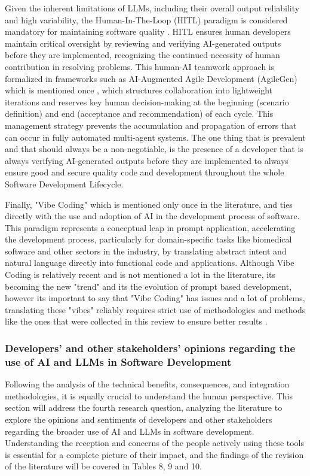 Given the inherent limitations of LLMs, including their overall output reliability and high variability, the Human-In-The-Loop (HITL) paradigm is considered mandatory for maintaining software quality \cite{Kim:2025ao}. HITL ensures human developers maintain critical oversight by reviewing and verifying AI-generated outputs before they are implemented, recognizing the continued necessity of human contribution in resolving problems. This human-AI teamwork approach is formalized in frameworks such as AI-Augmented Agile Development (AgileGen) which is mentioned once \cite{Zhang:2025ea}, which structures collaboration into lightweight iterations and reserves key human decision-making at the beginning (scenario definition) and end (acceptance and recommendation) of each cycle. This management strategy prevents the accumulation and propagation of errors that can occur in fully automated multi-agent systems. The one thing that is prevalent and that should always be a non-negotiable, is the presence of a developer that is always verifying AI-generated outputs before they are implemented to always ensure good and secure quality code and development throughout the whole Software Development Lifecycle.

Finally, "Vibe Coding" which is mentioned only once in the literature, and ties directly with the use and adoption of AI in the development process of software. This paradigm represents a conceptual leap in prompt application, accelerating the development process, particularly for domain-specific tasks like biomedical software and other sectors in the industry, by translating abstract intent and natural language directly into functional code and applications. Although Vibe Coding is relatively recent and is not mentioned a lot in the literature, its becoming the new "trend" and its the evolution of prompt based development, however its important to say that "Vibe Coding" has issues and a lot of problems, translating these "vibes" reliably requires strict use of methodologies and methods like the ones that were collected in this review to ensure better results \cite{Moore:2025vc}. 


\subsubsection{Developers’ and other stakeholders’ opinions regarding the use of AI and LLMs in Software Development}

Following the analysis of the technical benefits, consequences, and integration methodologies, it is equally crucial to understand the human perspective. This section will address the fourth research question, analyzing the literature to explore the opinions and sentiments of developers and other stakeholders regarding the broader use of AI and LLMs in software development. Understanding the reception and concerns of the people actively using these tools is essential for a complete picture of their impact, and the findings of the revision of the literature will be covered in Tables 8, 9 and 10.

